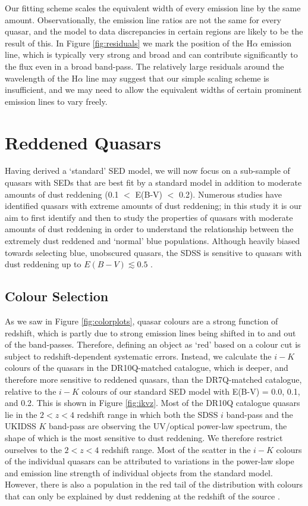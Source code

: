 Our fitting scheme scales the equivalent width of every emission line by the same amount. Observationally, the emission line ratios are not the same for every quasar, and the model to data discrepancies in certain regions are likely to be the result of this. In Figure \ref{fig:residuals} we mark the position of the H$\alpha$ emission line, which is typically very strong and broad and can contribute significantly to the flux even in a broad band-pass. The relatively large residuals around the wavelength of the H$\alpha$ line may suggest that our simple scaling scheme is insufficient, and we may need to allow the equivalent widths of certain prominent emission lines to vary freely. 

\section{Reddened Quasars}
\label{sec:redobjects}

Having derived a `standard' SED model, we will now focus on a sub-sample of quasars with SEDs that are best fit by a standard model in addition to moderate amounts of dust reddening (0.1 $<$ E(B-V) $<$ 0.2). Numerous studies have identified quasars with extreme amounts of dust reddening; in this study it is our aim to first identify and then to study the properties of quasars with moderate amounts of dust reddening in order to understand the relationship between the extremely dust reddened and `normal' blue populations. Although heavily biased towards selecting blue, unobscured quasars, the SDSS is sensitive to quasars with dust reddening up to $E(B-V) \lesssim 0.5$ \citep{richards03}. 

\subsection{Colour Selection}

As we saw in Figure \ref{fig:colorplots}, quasar colours are a strong function of redshift, which is partly due to strong emission lines being shifted in to and out of the band-passes. Therefore, defining an object as `red' based on a colour cut is subject to redshift-dependent systematic errors. Instead, we calculate the $i-K$ colours of the quasars in the DR10Q-matched catalogue, which is deeper, and therefore more sensitive to reddened quasars, than the DR7Q-matched catalogue, relative to the $i-K$ colours of our standard SED model with E(B-V) = 0.0, 0.1, and 0.2. This is shown in Figure \ref{fig:ikvz}. Most of the DR10Q catalogue quasars lie in the $2 < z < 4$ redshift range in which both the SDSS $i$ band-pass and the UKIDSS $K$ band-pass are observing the UV/optical power-law spectrum, the shape of which is the most sensitive to dust reddening. We therefore restrict ourselves to the $2 < z < 4$ redshift range. Most of the scatter in the $i-K$ colours of the individual quasars can be attributed to variations in the power-law slope and emission line strength of individual objects from the standard model. However, there is also a population in the red tail of the distribution with colours that can only be explained by dust reddening at the redshift of the source \citep{hall04}. 

